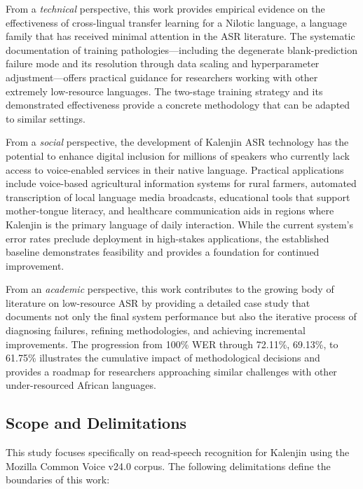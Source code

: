 \documentclass[journal]{IEEEtran}
\begin{document}
From a \textit{technical} perspective, this work provides empirical evidence on the effectiveness of cross-lingual transfer learning for a Nilotic language, a language family that has received minimal attention in the ASR literature. The systematic documentation of training pathologies---including the degenerate blank-prediction failure mode and its resolution through data scaling and hyperparameter adjustment---offers practical guidance for researchers working with other extremely low-resource languages. The two-stage training strategy and its demonstrated effectiveness provide a concrete methodology that can be adapted to similar settings.

From a \textit{social} perspective, the development of Kalenjin ASR technology has the potential to enhance digital inclusion for millions of speakers who currently lack access to voice-enabled services in their native language. Practical applications include voice-based agricultural information systems for rural farmers, automated transcription of local language media broadcasts, educational tools that support mother-tongue literacy, and healthcare communication aids in regions where Kalenjin is the primary language of daily interaction. While the current system's error rates preclude deployment in high-stakes applications, the established baseline demonstrates feasibility and provides a foundation for continued improvement.

From an \textit{academic} perspective, this work contributes to the growing body of literature on low-resource ASR by providing a detailed case study that documents not only the final system performance but also the iterative process of diagnosing failures, refining methodologies, and achieving incremental improvements. The progression from 100\% WER through 72.11\%, 69.13\%, to 61.75\% illustrates the cumulative impact of methodological decisions and provides a roadmap for researchers approaching similar challenges with other under-resourced African languages.

\subsection{Scope and Delimitations}

This study focuses specifically on read-speech recognition for Kalenjin using the Mozilla Common Voice v24.0 corpus. The following delimitations define the boundaries of this work:
\end{document}
